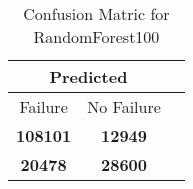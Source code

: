 \begin{table}[] 
\caption{Confusion Matric for RandomForest100} 
\label{Table: Prediction Accuracy-DMDRandomForest100OnlySunEKF-combinationReflection-Reflection} 
\centering 
\begin{tabular} 
 {@{}ccc@{}} 
\toprule 
\multicolumn{2}{c}{\textbf{Predicted}}
 \\ \midrule 
\multicolumn{1}{|c|}{Failure} & 
\multicolumn{1}{c|}{No Failure}
 \\ \midrule 
\multicolumn{1}{|c|}{\color{green}\textbf{108101}} & 
\multicolumn{1}{c|}{\color{red}\textbf{12949}}
 \\ \midrule 
\multicolumn{1}{|c|}{\color{red}\textbf{20478}} & 
\multicolumn{1}{c|}{\color{green}\textbf{28600}}
 \\ \bottomrule 
\end{tabular} 
\end{table} 
